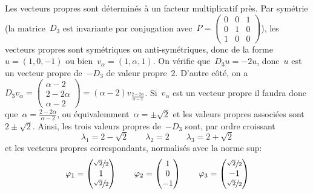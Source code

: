 Les vecteurs propres %
sont déterminés à un
facteur multiplicatif près.  Par symétrie (la matrice~$D_3$ est invariante par
conjugation
avec~$P=\left(\begin{smallmatrix}0&0&1\\0&1&0\\1&0&0\end{smallmatrix}\right)$),
les vecteurs propres sont symétriques ou anti-symétriques, donc de la
forme~$u=(1,0,-1)$ ou bien~$v_\alpha=(1,\alpha,1)$.  On vérifie que~$D_3u=-2u$,
donc~$u$ est un vecteur propre de~$-D_3$ de valeur propre~$2$.   D'autre côté,
on a~$D_3
v_\alpha
=
\left(\begin{smallmatrix}\alpha-2\\2-2\alpha\\\alpha-2\end{smallmatrix}\right)
=
(\alpha-2)
v_\frac{2-2\alpha}{\alpha-2}
$.  Si~$v_\alpha$ est un vecteur propre il faudra donc
que~$\alpha=\frac{2-2\alpha}{\alpha-2}$, ou équivalemment~$\alpha=\pm\sqrt 2$
et les valeurs propres associées sont~$2\pm\sqrt 2$.
Ainsi, les trois valeurs
propres de~$-D_3$ sont, par ordre croissant
\[
	\lambda_1 = 2-\sqrt2
	\qquad
	\lambda_2 = 2
	\qquad
	\lambda_3 = 2+\sqrt2
\]
et les vecteurs propres correspondants, normalisés avec la norme sup:
\[
	\varphi_1=\begin{pmatrix}
		\sfrac{\sqrt2}2\\
		1\\
		\sfrac{\sqrt2}2
	\end{pmatrix}
	\qquad
	\varphi_2=\begin{pmatrix}
		1\\
		0\\
		-1
	\end{pmatrix}
	\qquad
	\varphi_3=\begin{pmatrix}
		\sfrac{\sqrt2}2\\
		-1\\
		\sfrac{\sqrt2}2
	\end{pmatrix}
\]
